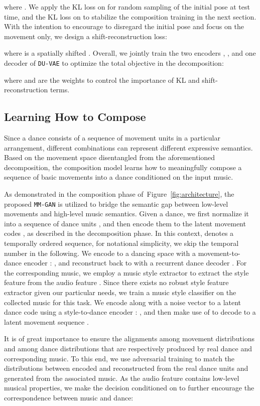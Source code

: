 \documentclass{article}
\newlength\secmargin
\newlength\subsecmargin
\newcommand{\figref}[1]{Figure~\ref{fig:#1}}
\begin{document}
where . 
We apply the KL loss on  for random sampling of the initial pose at test time, and the KL loss on  to stabilize the composition training in the next section. With the intention to encourage  to disregard the initial pose and focus on the movement only, we design a shift-reconstruction loss:

where  is a spatially shifted . 
Overall, we jointly train the two encoders , , and one decoder  of \texttt{DU-VAE} to optimize the total objective in the decomposition:

\noindent where  and  are the weights to control the importance of KL and shift-reconstruction terms. 



\subsection{Learning How to Compose}
\label{subsec:stage2}
\vspace{\subsecmargin}
Since a dance consists of a sequence of movement units in a particular arrangement, different combinations can represent different expressive semantics. 
Based on the movement space  disentangled from the aforementioned decomposition, the composition model learns how to meaningfully compose a sequence of basic movements into a dance conditioned on the input music.

As demonstrated in the composition phase of~\figref{architecture}, the proposed \texttt{MM-GAN} is utilized to bridge the semantic gap between low-level movements and high-level music semantics. 
Given a dance, we first normalize it into a sequence of  dance units , and then encode them to the latent movement codes , as described in the decomposition phase. 
In this context,  denotes a temporally ordered sequence, for notational simplicity, we skip the temporal number  in the following. 
We encode  to a dancing space  with a movement-to-dance encoder : , and reconstruct  back to  with a recurrent dance decoder .
For the corresponding music, we employ a music style extractor to extract the style feature  from the audio feature .
Since there exists no robust style feature extractor given our particular needs, we train a music style classifier on the collected music for this task.
We encode  along with a noise vector  to a latent dance code  using a style-to-dance encoder : , and then make use of  to decode  to a latent movement sequence . 


It is of great importance to ensure the alignments among movement distributions and among dance distributions that are respectively produced by real dance and corresponding music.  
To this end, we use adversarial training to match the distributions between   encoded and reconstructed from the real dance units and  generated from the associated music.
As the audio feature  contains low-level musical properties, we make the decision conditioned on  to further encourage the correspondence between music and dance:
\end{document}
